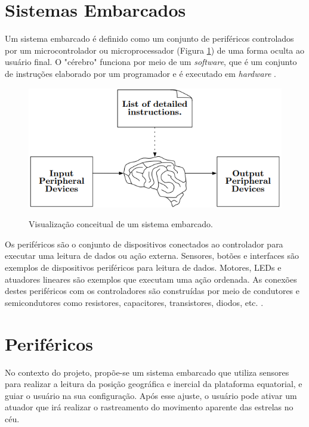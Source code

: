 \section{Sistemas Embarcados}

Um sistema embarcado é definido como um conjunto de periféricos controlados por um microcontrolador ou microprocessador (Figura \ref{fig:embbedsystem}) de uma forma oculta ao usuário final. O "cérebro" funciona por meio de um \textit{software}, que é um conjunto de instruções elaborado por um programador e é executado em \textit{hardware} \cite{book:ANSIC}.

\begin{figure}[!htb]
	\centering
	\caption{Visualização conceitual de um sistema embarcado.}
	\includegraphics[width=0.7\linewidth]{figuras/embbedsystem}
	\label{fig:embbedsystem}
\end{figure}

Os periféricos são o conjunto de dispositivos conectados ao controlador para executar uma leitura de dados ou ação externa. Sensores, botões e interfaces são exemplos de dispositivos periféricos para leitura de dados. Motores, LEDs e atuadores lineares são exemplos que executam uma ação ordenada. As conexões destes periféricos com os controladores são construídas por meio de condutores e semicondutores como resistores, capacitores, transistores, diodos, etc. \cite{book:ANSIC}. 


\section{Periféricos}

No contexto do projeto, propõe-se um sistema embarcado que utiliza sensores para realizar a leitura da posição geográfica e inercial da plataforma equatorial, e guiar o usuário na sua configuração. Após esse ajuste, o usuário pode ativar um atuador que irá realizar o rastreamento do movimento aparente das estrelas no céu. 

